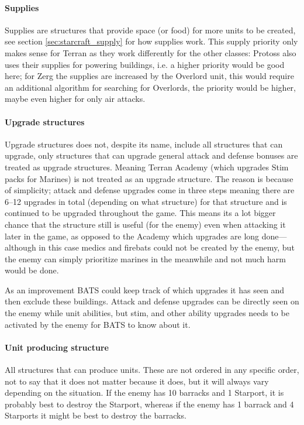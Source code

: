 \paragraph{Supplies \attackCoordinatorWeightsSupplyStructure}
Supplies are structures that provide space (or food) for more units to be created, see section \ref{sec:starcraft_supply} for how supplies work. This supply priority only makes sense for Terran as they work differently for the other classes: Protoss also uses their supplies for powering buildings, i.e. a higher priority would be good here; for Zerg the supplies are increased by the Overlord unit, this would require an additional algorithm for searching for Overlords, the priority would be higher, maybe even higher for only air attacks.

\paragraph{Upgrade structures \attackCoordinatorWeightsUpgradeStructure}
Upgrade structures does not, despite its name, include all structures that can upgrade, only structures that can upgrade general attack and defense bonuses are treated as upgrade structures. Meaning Terran Academy (which upgrades Stim packs for Marines) is not treated as an upgrade structure. The reason is because of simplicity; attack and defense upgrades come in three steps meaning there are 6–12 upgrades in total (depending on what structure) for that structure and is continued to be upgraded throughout the game. This means its a lot bigger chance that the structure still is useful (for the enemy) even when attacking it later in the game, as opposed to the Academy which upgrades are long done—although in this case medics and firebats could not be created by the enemy, but the enemy can simply prioritize marines in the meanwhile and not much harm would be done.

As an improvement BATS could keep track of which upgrades it has seen and then exclude these buildings. Attack and defense upgrades can be directly seen on the enemy while unit abilities, but stim, and other ability upgrades needs to be activated by the enemy for BATS to know about it.

\paragraph{Unit producing structure \attackCoordinatorWeightsUnitProducingStructure}
All structures that can produce units. These are not ordered in any specific order, not to say that it does not matter because it does, but it will always vary depending on the situation. If the enemy has 10 barracks and 1 Starport, it is probably best to destroy the Starport, whereas if the enemy has 1 barrack and 4 Starports it might be best to destroy the barracks.

